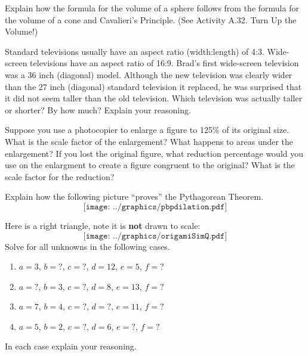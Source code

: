 \begin{prob}
Explain how the formula for the volume of a sphere follows from the formula for the volume of a cone and Cavalieri's Principle.  (See Activity A.32. Turn Up the Volume!)
\end{prob}

\begin{prob}
Standard televisions usually have an aspect ratio (width:length) of 4:3.  Wide-screen televisions have an aspect ratio of 16:9.  Brad's first wide-screen television was a 36 inch (diagonal) model.  Although the new television was clearly wider than the 27 inch (diagonal) standard television it replaced, he was surprised that it did not seem taller than the old television.  Which television was actually taller or shorter?  By how much?  Explain your reasoning.   
\end{prob}


\begin{prob}
Suppose you use a photocopier to enlarge a figure to 125\% of its original size.  What is the scale factor of the enlargement?  What happens to areas under the enlargement?  If you lost the original figure, what reduction percentage would you use on the enlargment to create a figure congruent to the original?  What is the scale factor for the reduction?  
\end{prob}

\begin{prob}
Explain how the following picture ``proves'' the Pythagorean Theorem.
\[
\texttt{[image: ../graphics/pbpdilation.pdf]}
\]
\end{prob}

\begin{prob}
Here is a right triangle, note it is \textbf{not} drawn to scale:
\[
\texttt{[image: ../graphics/origamiSimQ.pdf]}
\]
Solve for all unknowns in the following cases.
\begin{enumerate}
\item $a = 3$, $b = ?$, $c = ?$, $d = 12$, $e = 5$, $f = ?$
\item $a = ?$, $b = 3$, $c = ?$, $d =8$, $e = 13$, $f = ?$
\item $a = 7$, $b = 4$, $c = ?$, $d =?$, $e = 11$, $f = ?$
\item $a = 5$, $b = 2$, $c = ?$, $d =6$, $e = ?$, $f = ?$
\end{enumerate}
In each case explain your reasoning.
\end{prob}

